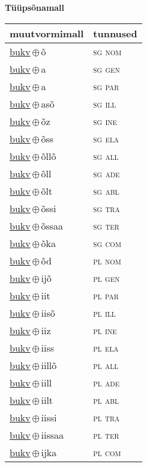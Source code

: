 

\vspace{3.5em}
\noindent \begin{minipage}{\textwidth}
\noindent \textbf{Tüüpsõnamall \,}\\

\begin{sideways}
\begin{tabular}{l l}
muutvormimall & tunnused \\
\hline
\underline{bukv}\,$\oplus$\,õ & \textsc{ sg nom } \\
\underline{bukv}\,$\oplus$\,a & \textsc{ sg gen } \\
\underline{bukv}\,$\oplus$\,a & \textsc{ sg par } \\
\underline{bukv}\,$\oplus$\,asõ & \textsc{ sg ill } \\
\underline{bukv}\,$\oplus$\,õz & \textsc{ sg ine } \\
\underline{bukv}\,$\oplus$\,õss & \textsc{ sg ela } \\
\underline{bukv}\,$\oplus$\,õllõ & \textsc{ sg all } \\
\underline{bukv}\,$\oplus$\,õll & \textsc{ sg ade } \\
\underline{bukv}\,$\oplus$\,õlt & \textsc{ sg abl } \\
\underline{bukv}\,$\oplus$\,õssi & \textsc{ sg tra } \\
\underline{bukv}\,$\oplus$\,õssaa & \textsc{ sg ter } \\
\underline{bukv}\,$\oplus$\,õka & \textsc{ sg com } \\
\underline{bukv}\,$\oplus$\,õd & \textsc{ pl nom } \\
\underline{bukv}\,$\oplus$\,ijõ & \textsc{ pl gen } \\
\underline{bukv}\,$\oplus$\,iit & \textsc{ pl par } \\
\underline{bukv}\,$\oplus$\,iisõ & \textsc{ pl ill } \\
\underline{bukv}\,$\oplus$\,iiz & \textsc{ pl ine } \\
\underline{bukv}\,$\oplus$\,iiss & \textsc{ pl ela } \\
\underline{bukv}\,$\oplus$\,iillõ & \textsc{ pl all } \\
\underline{bukv}\,$\oplus$\,iill & \textsc{ pl ade } \\
\underline{bukv}\,$\oplus$\,iilt & \textsc{ pl abl } \\
\underline{bukv}\,$\oplus$\,iissi & \textsc{ pl tra } \\
\underline{bukv}\,$\oplus$\,iissaa & \textsc{ pl ter } \\
\underline{bukv}\,$\oplus$\,ijka & \textsc{ pl com } \\
\end{tabular}
\end{sideways}
\label{tab:tüüpsõnamall-bukvõ}

\end{minipage}

